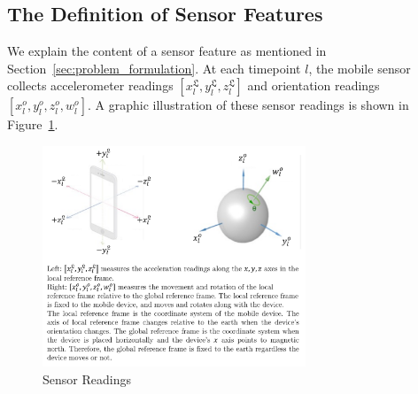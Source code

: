 \begin{appendices}



\section{The Definition of Sensor Features}\label{apd:sen_features}

We explain the content of a sensor feature as mentioned in Section~\ref{sec:problem_formulation}.
At each timepoint $l$, the mobile sensor collects accelerometer readings $[x_l^{\mathfrak{L}},y_l^{\mathfrak{L}},z_l^{\mathfrak{L}}]$ and orientation readings $[x_l^{o},y_l^{o},z_l^{o},w_l^{o}]$. A graphic illustration of these sensor readings is shown in Figure~\ref{fig:frame_change}.
\begin{figure}[h]
    \centering
    \includegraphics[width=0.7\textwidth]{imgs/frame_change.pdf}
    \caption{Sensor Readings \protect\cite{apple_inc_understanding_2022_a} }
    \label{fig:frame_change}
\end{figure}


\end{appendices}
